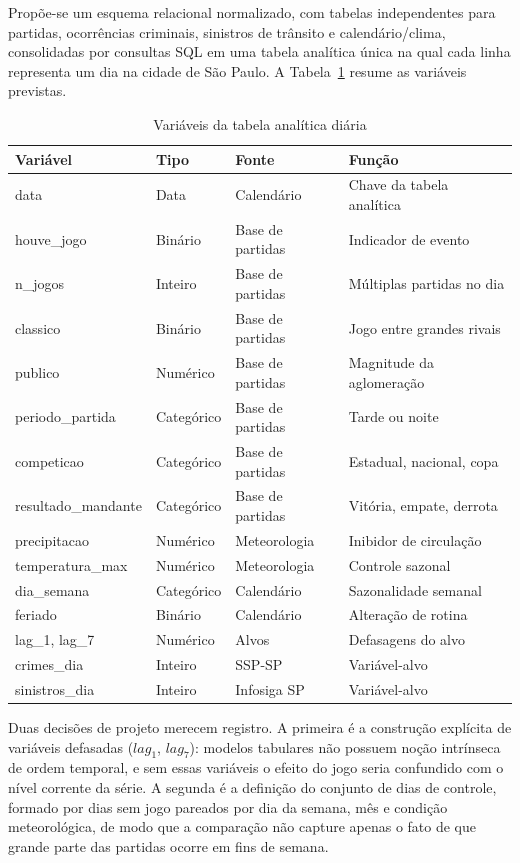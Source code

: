 \documentclass[12pt]{article}
\begin{document}
Propõe-se um esquema relacional normalizado, com tabelas independentes para
partidas, ocorrências criminais, sinistros de trânsito e calendário/clima,
consolidadas por consultas SQL em uma tabela analítica única na qual cada linha
representa um dia na cidade de São Paulo. A Tabela~\ref{tab:variaveis} resume as
variáveis previstas.

\begin{table}[ht]
\centering
\caption{Variáveis da tabela analítica diária}
\label{tab:variaveis}
\small
\begin{tabular}{@{}llll@{}}
\toprule
\textbf{Variável} & \textbf{Tipo} & \textbf{Fonte} & \textbf{Função} \\
\midrule
data & Data & Calendário & Chave da tabela analítica \\
houve\_jogo & Binário & Base de partidas & Indicador de evento \\
n\_jogos & Inteiro & Base de partidas & Múltiplas partidas no dia \\
classico & Binário & Base de partidas & Jogo entre grandes rivais \\
publico & Numérico & Base de partidas & Magnitude da aglomeração \\
periodo\_partida & Categórico & Base de partidas & Tarde ou noite \\
competicao & Categórico & Base de partidas & Estadual, nacional, copa \\
resultado\_mandante & Categórico & Base de partidas & Vitória, empate, derrota \\
precipitacao & Numérico & Meteorologia & Inibidor de circulação \\
temperatura\_max & Numérico & Meteorologia & Controle sazonal \\
dia\_semana & Categórico & Calendário & Sazonalidade semanal \\
feriado & Binário & Calendário & Alteração de rotina \\
lag\_1, lag\_7 & Numérico & Alvos & Defasagens do alvo \\
crimes\_dia & Inteiro & SSP-SP & Variável-alvo \\
sinistros\_dia & Inteiro & Infosiga SP & Variável-alvo \\
\bottomrule
\end{tabular}
\end{table}

Duas decisões de projeto merecem registro. A primeira é a construção explícita
de variáveis defasadas ($lag_1$, $lag_7$): modelos tabulares não possuem noção
intrínseca de ordem temporal, e sem essas variáveis o efeito do jogo seria
confundido com o nível corrente da série. A segunda é a definição do conjunto
de dias de controle, formado por dias sem jogo pareados por dia da semana, mês
e condição meteorológica, de modo que a comparação não capture apenas o fato de
que grande parte das partidas ocorre em fins de semana.
\end{document}
